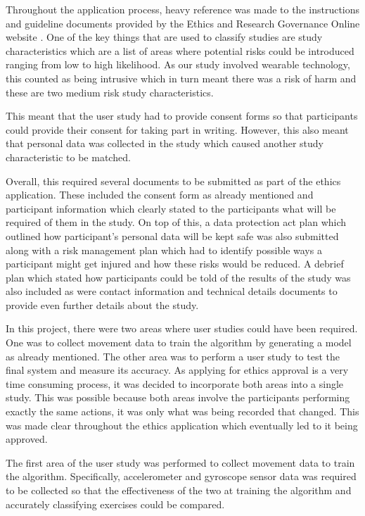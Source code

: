 Throughout the application process, heavy reference was made to the instructions and guideline documents provided by the Ethics and Research Governance Online website \cite{ergo}. One of the key things that are used to classify studies are study characteristics which are a list of areas where potential risks could be introduced ranging from low to high likelihood. As our study involved wearable technology, this counted as being intrusive which in turn meant there was a risk of harm and these are two medium risk study characteristics.

This meant that the user study had to provide consent forms so that participants could provide their consent for taking part in writing. However, this also meant that personal data was collected in the study which caused another study characteristic to be matched.

Overall, this required several documents to be submitted as part of the ethics application. These included the consent form as already mentioned and participant information which clearly stated to the participants what will be required of them in the study. On top of this, a data protection act plan which outlined how participant’s personal data will be kept safe was also submitted along with a risk management plan which had to identify possible ways a participant might get injured and how these risks would be reduced. A debrief plan which stated how participants could be told of the results of the study was also included as were contact information and technical details documents to provide even further details about the study.

In this project, there were two areas where user studies could have been required. One was to collect movement data to train the algorithm by generating a model as already mentioned. The other area was to perform a user study to test the final system and measure its accuracy. As applying for ethics approval is a very time consuming process, it was decided to incorporate both areas into a single study. This was possible because both areas involve the participants performing exactly the same actions, it was only what was being recorded that changed. This was made clear throughout the ethics application which eventually led to it being approved.

The first area of the user study was performed to collect movement data to train the algorithm. Specifically, accelerometer and gyroscope sensor data was required to be collected so that the effectiveness of the two at training the algorithm and accurately classifying exercises could be compared.

